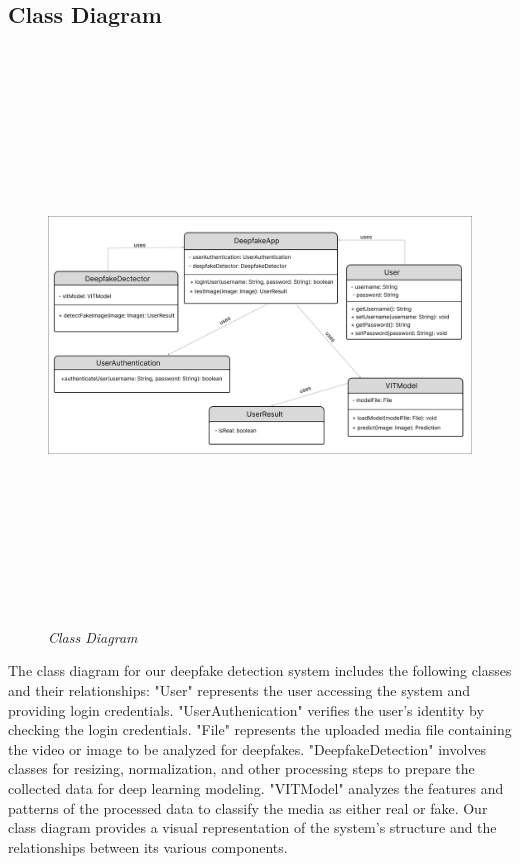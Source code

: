 
\subsection{Class Diagram}
\vspace{1cm}
\begin{figure}[h]
    \includegraphics[width=1\textwidth,height=6in,keepaspectratio]{img/classdiagram.jpg}
    \caption{\textit{Class Diagram}}
\end{figure}

\justify
The class diagram for our deepfake detection system includes the following classes and their relationships: "User" represents the user accessing the system and providing login credentials. "UserAuthenication" verifies the user's identity by checking the login credentials. "File" represents the uploaded media file containing the video or image to be analyzed for deepfakes. "DeepfakeDetection" involves classes for resizing, normalization, and other processing steps to prepare the collected data for deep learning modeling. "VITModel" analyzes the features and patterns of the processed data to classify the media as either real or fake. Our class diagram provides a visual representation of the system's structure and the relationships between its various components.

